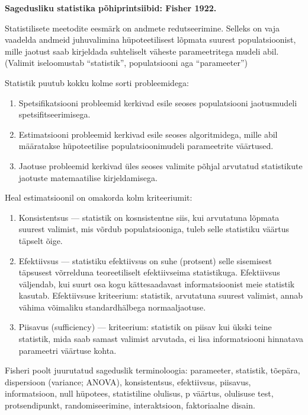 \documentclass[]{book}
\begin{document}
\textbf{Sagedusliku statistika põhiprintsiibid: Fisher 1922.}

Statistilisete meetodite eesmärk on andmete redutseerimine. Selleks on
vaja vaadelda andmeid juhuvalimina hüpoteetilisest lõpmata suurest
populatsioonist, mille jaotust saab kirjeldada suhteliselt väheste
parameetritega mudeli abil. (Valimit iseloomustab ``statistik'',
populatsiooni aga ``parameeter'')

Statistik puutub kokku kolme sorti probleemidega:

\begin{enumerate}
\def\labelenumi{\arabic{enumi}.}
\item
  Spetsifikatsiooni probleemid kerkivad esile seoses populatsiooni
  jaotusmudeli spetsifitseerimisega.
\item
  Estimatsiooni probleemid kerkivad esile seoses algoritmidega, mille
  abil määratakse hüpoteetilise populatsioonimudeli parameetrite
  väärtused.
\item
  Jaotuse probleemid kerkivad üles seoses valimite põhjal arvutatud
  statistikute jaotuste matemaatilise kirjeldamisega.
\end{enumerate}

Heal estimatsioonil on omakorda kolm kriteeriumit:

\begin{enumerate}
\def\labelenumi{\arabic{enumi}.}
\item
  Konsistentsus --- statistik on kosnsistentne siis, kui arvutatuna
  lõpmata suurest valimist, mis võrdub populatsiooniga, tuleb selle
  statistiku väärtus täpselt õige.
\item
  Efektiivsus --- statistiku efektiivsus on suhe (protsent) selle
  sisemisest täpsusest võrrelduna teoreetiliselt efektiivseima
  statistikuga. Efektiivsus väljendab, kui suurt osa kogu kättesaadavast
  informatsioonist meie statistik kasutab. Efektiivsuse kriteerium:
  statistik, arvutatuna suurest valimist, annab vähima võimaliku
  standardhälbega normaaljaotuse.
\item
  Piisavus (sufficiency) --- kriteerium: statistik on piisav kui ükski
  teine statistik, mida saab samast valimist arvutada, ei lisa
  informatsiooni hinnatava parameetri väärtuse kohta.
\end{enumerate}

Fisheri poolt juurutatud sageduslik terminoloogia: parameeter,
statistik, tõepära, dispersioon (variance; ANOVA), konsistentsus,
efektiivsus, piisavus, informatsioon, null hüpotees, statistiline
olulisus, p väärtus, olulisuse test, protsendipunkt, randomiseerimine,
interaktsioon, faktoriaalne disain.
\end{document}

